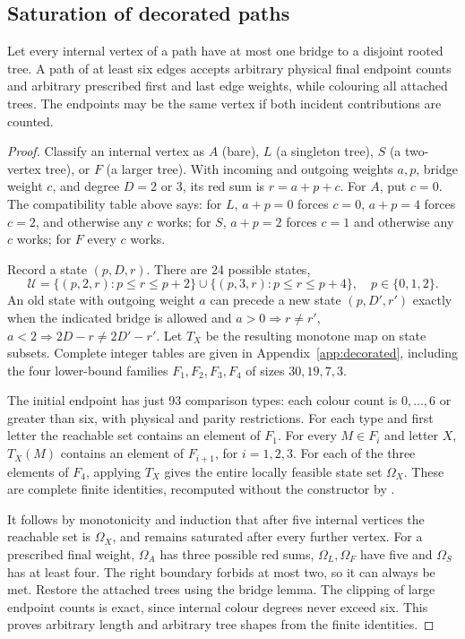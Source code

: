 \subsection{Saturation of decorated paths}\label{sec:decorated}

\begin{theorem}\label{thm:decorated}
Let every internal vertex of a path have at most one bridge to a
disjoint rooted tree. A path of at least six edges accepts arbitrary
physical final endpoint counts and arbitrary prescribed first and last
edge weights, while colouring all attached trees. The endpoints may be
the same vertex if both incident contributions are counted.
\end{theorem}
\begin{proof}
Classify an internal vertex as $A$ (bare), $L$ (a singleton tree),
$S$ (a two-vertex tree), or $F$ (a larger tree). With incoming and
outgoing weights $a,p$, bridge weight $c$, and degree $D=2$ or 3, its
red sum is $r=a+p+c$. For $A$, put $c=0$. The compatibility table
above says: for $L$, $a+p=0$ forces $c=0$, $a+p=4$ forces $c=2$,
and otherwise any $c$ works; for $S$, $a+p=2$ forces $c=1$ and
otherwise any $c$ works; for $F$ every $c$ works.

Record a state $(p,D,r)$. There are 24 possible states,
\[
 \mathcal U=\{(p,2,r):p\le r\le p+2\}
 \cup\{(p,3,r):p\le r\le p+4\},\quad p\in\{0,1,2\}.
\]
An old state with outgoing weight $a$ can precede a new state
$(p,D',r')$ exactly when the indicated bridge is allowed and
$a>0\Rightarrow r\ne r'$, $a<2\Rightarrow2D-r\ne2D'-r'$.
Let $T_X$ be the resulting monotone map on state subsets. Complete
integer tables are given in Appendix~\ref{app:decorated}, including the
four lower-bound families $F_1,F_2,F_3,F_4$ of sizes $30,19,7,3$.

The initial endpoint has just 93 comparison types: each colour count
is $0,\ldots,6$ or greater than six, with physical and parity
restrictions. For each type and first letter the reachable set contains
an element of $F_1$. For every $M\in F_i$ and letter $X$, $T_X(M)$
contains an element of $F_{i+1}$, for $i=1,2,3$.
For each of the three elements of $F_4$, applying $T_X$ gives the
entire locally feasible state set $\Omega_X$. These are complete finite
identities, recomputed without the constructor by
.

It follows by monotonicity and induction that after five internal
vertices the reachable set is $\Omega_X$, and remains saturated after
every further vertex. For a prescribed final weight, $\Omega_A$ has
three possible red sums, $\Omega_L,\Omega_F$ have five and $\Omega_S$
has at least four. The right boundary forbids at most two, so it can
always be met. Restore the attached trees using the bridge lemma.
The clipping of large endpoint counts is exact, since internal colour
degrees never exceed six. This proves arbitrary length and arbitrary
tree shapes from the finite identities.
\end{proof}

